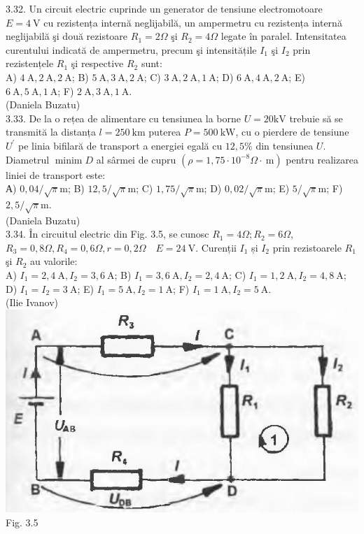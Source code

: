 \documentclass[10pt]{article}
\begin{document}
3.32. Un circuit electric cuprinde un generator de tensiune electromotoare $E=4 \mathrm{~V}$ cu rezistența internă neglijabilă, un ampermetru cu rezistența internă neglijabilă şi două rezistoare $R_{1}=2 \Omega$ şi $R_{2}=4 \Omega$ legate în paralel. Intensitatea curentului indicată de ampermetru, precum şi intensitățile $I_{1}$ şi $I_{2}$ prin rezistențele $R_{1}$ şi respective $R_{2}$ sunt:\\ A) $4 \mathrm{~A} , 2 \mathrm{~A} , 2 \mathrm{~A}$; B) $5 \mathrm{~A} , 3 \mathrm{~A} , 2 \mathrm{~A}$; C) $3 \mathrm{~A} , 2 \mathrm{~A} , 1 \mathrm{~A}$; D) $6 \mathrm{~A} , 4 \mathrm{~A} , 2 \mathrm{~A}$; E) $6 \mathrm{~A} , 5 \mathrm{~A} , 1 \mathrm{~A}$; F) $2 \mathrm{~A} , 3 \mathrm{~A} , 1 \mathrm{~A}$.\\ (Daniela Buzatu)\\

3.33. De la o rețea de alimentare cu tensiunea la borne $U=20 \mathrm{kV}$ trebuie să se transmită la distanța $l=250 \mathrm{~km}$ puterea $P=500 \mathrm{~kW}$, cu o pierdere de tensiune $U^{\prime}$ pe linia bifilară de transport a energiei egală cu $12,5 \%$ din tensiunea $U$. Diametrul $\operatorname{minim} D$ al sârmei de cupru $\left(\rho=1,75 \cdot 10^{-8} \Omega \cdot \mathrm{~m}\right)$ pentru realizarea liniei de transport este:\\ А) $0,04 / \sqrt{\pi} \mathrm{m}$; B) $12,5 / \sqrt{\pi} \mathrm{m}$; C) $1,75 / \sqrt{\pi} \mathrm{m}$; D) $0,02 / \sqrt{\pi} \mathrm{m}$; E) $5 / \sqrt{\pi} \mathrm{m}$; F) $2,5 / \sqrt{\pi} \mathrm{m}$.\\ (Daniela Buzatu)\\

3.34. În circuitul electric din Fig. 3.5, se cunosc $R_{1}=4 \Omega ; R_{2}=6 \Omega$, $R_{3}=0,8 \Omega, R_{4}=0,6 \Omega, r=0,2 \Omega \quad E=24 \mathrm{~V}$. Curenții $I_{1}$ și $I_{2}$ prin rezistoarele $R_{1}$ şi $R_{2}$ au valorile:\\ A) $I_{1}=2,4 \mathrm{~A} , I_{2}=3,6 \mathrm{~A}$; B) $I_{1}=3,6 \mathrm{~A} , I_{2}=2,4 \mathrm{~A}$; C) $I_{1}=1,2 \mathrm{~A} , I_{2}=4,8 \mathrm{~A}$; D) $I_{1}=I_{2}=3 \mathrm{~A}$; E) $I_{1}=5 \mathrm{~A} , I_{2}=1 \mathrm{~A}$; F) $I_{1}=1 \mathrm{~A} , I_{2}=5 \mathrm{~A}$.\\ (Ilie Ivanov)\\ \includegraphics[max width=\textwidth, center]{2025_07_01_5b3ff9fa0d508c8e9f17g-151(3)} Fig. 3.5\\
\end{document}
